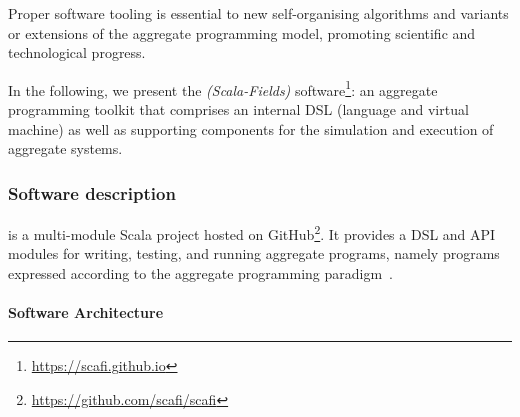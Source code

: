 Proper software tooling
is essential to new self-organising algorithms
and variants or extensions of the aggregate programming model,
promoting scientific and technological progress.

In the following, we present the
 \emph{\scafi{} (Scala-Fields)} software\footnote{\url{https://scafi.github.io}}: 
 an aggregate programming toolkit
 that comprises an internal DSL (language and virtual machine)
 as well as supporting components for the simulation
 and execution %
 of aggregate systems.

\subsubsection{Software description}
\label{}
\scafi{} is a multi-module Scala project hosted on GitHub\footnote{\url{https://github.com/scafi/scafi}}.
%
It provides a DSL and API modules for 
 writing, testing, and running aggregate programs, namely programs expressed according to the aggregate programming paradigm~\cite{DBLP:journals/computer/BealPV15,DBLP:journals/jlap/ViroliBDACP19}.
%
%
%
\paragraph{Software Architecture}
\label{sec:scafi-arch-design}


